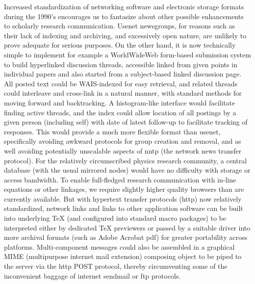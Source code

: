 Increased standardization of networking software and electronic storage formats
during the 1990's encourages us to fantasize about other possible enhancements
to scholarly research communication. Usenet newsgroups, for reasons such as
their lack of indexing and archiving, and excessively open nature, are unlikely
to prove adequate for serious purposes. On the other hand, it is now
technically simple to implement for example a WorldWideWeb form-based
submission system to build hyperlinked discussion threads,
accessible linked from given points in individual papers
and also started from a subject-based linked discussion page.
All posted text could be WAIS-indexed for easy retrieval, and
related threads could interleave and cross-link in a natural manner, with
standard methods for moving forward and backtracking. A histogram-like
interface would facilitate finding active threads, and the index could allow
location of all postings by a given person (including self) with date of latest
follow-up to facilitate tracking of responses. This would provide a much more
flexible format than usenet, specifically avoiding awkward protocols for group
creation and removal, and as well avoiding potentially unscalable aspects of
nntp (the network news transfer protocol). For the relatively circumscribed
physics research community, a central database (with the usual mirrored nodes)
would have no difficulty with storage or access bandwidth. To enable
full-fledged research communication with in-line equations or other linkages,
we require slightly higher quality browsers than are currently available. But
with hypertext transfer protocols (http) now relatively standardized, network
links and links to other application software can be built into underlying TeX
(and configured into standard macro packages) to be interpreted either by
dedicated TeX previewers or passed by a suitable driver into more archival
formats (such as Adobe Acrobat pdf) for greater portability across platforms.
Multi-component messages could also be assembled in a graphical MIME
(multipurpose internet mail extension) composing object to be piped to the
server via the http POST protocol, thereby circumventing some of the
inconvenient baggage of internet sendmail or ftp protocols.


